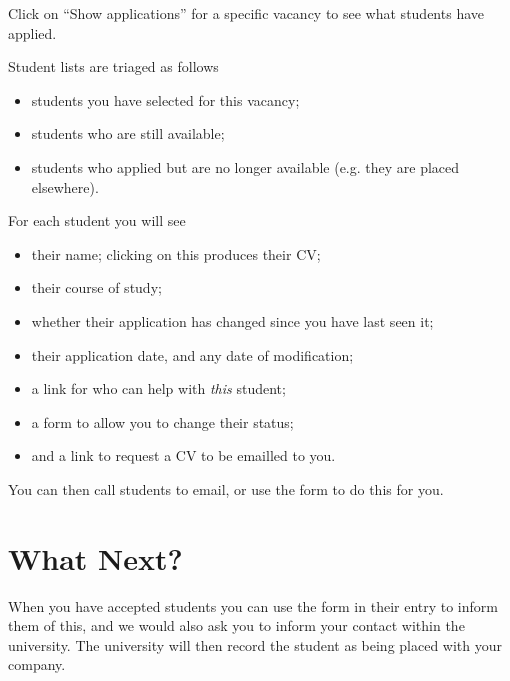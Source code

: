 Click on ``Show applications'' for a specific vacancy to see
what students have applied.

Student lists are triaged as follows
\begin{itemize}
\item students you have selected for this vacancy;
\item students who are still available;
\item students who applied but are no longer available (e.g. they are placed elsewhere).
\end{itemize}

For each student you will see
\begin{itemize}
\item their name; clicking on this produces their CV;
\item their course of study;
\item whether their application has changed since you have last seen it;
\item their application date, and any date of modification;
\item a link for who can help with \emph{this} student;
\item a form to allow you to change their status;
\item and a link to request a CV to be emailled to you.
\end{itemize}

You can then call students to email, or use the form to do this
for you.

\section{What Next?}

When you have accepted students you can use the form in their
entry to inform them of this, and we would also ask you to
inform your contact within the university. The university will
then record the student as being placed with your company.
